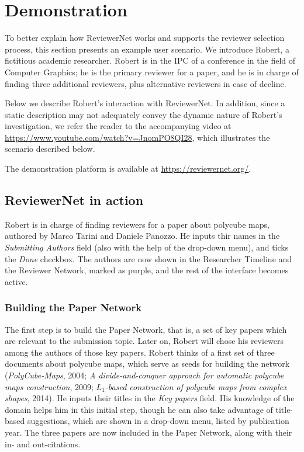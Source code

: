 \chapter{Demonstration}\label{sec:demonstration}
To better explain how ReviewerNet works and supports the reviewer selection process, this section presents an example user scenario. We introduce Robert, a fictitious academic researcher. Robert is in the IPC of a conference in the field of Computer Graphics; he is the primary reviewer for a paper, and he is in charge of finding three additional reviewers, plus alternative reviewers in case of decline. 

Below we describe Robert's interaction with ReviewerNet. In addition, since a static description may not adequately convey the dynamic nature of Robert's investigation, we refer the reader to the accompanying video at \url{https://www.youtube.com/watch?v=JnomPO8QI28}, which illustrates the scenario described below. 

The demonstration platform is available at \url{https://reviewernet.org/}. 

\section{ReviewerNet in action}

Robert is in charge of finding reviewers for a paper about polycube maps, authored by Marco Tarini and Daniele Panozzo. He inputs thir names in the \emph{Submitting Authors} field (also with the help of the drop-down menu), and ticks the \emph{Done} checkbox. The authors are now shown in the Researcher Timeline and the Reviewer Network, marked as purple, and the rest of the interface becomes active. 

\subsection{Building the Paper Network} 
\label{sec:demoPN}
The first step is to build the Paper Network, that is, a set of key papers which are relevant to the submission topic. Later on, Robert will chose his reviewers among the authors of those key papers. Robert thinks of a first set of three documents about polycube maps, which serve as seeds for building the network (\emph{PolyCube-Maps}, 2004; \emph{A divide-and-conquer approach for automatic polycube maps construction}, 2009; \emph{$L_1$-based construction of polycube maps from complex shapes}, 2014). He inputs their titles in the \emph{Key papers} field. His knowledge of the domain helps him in this initial step, though he can also take advantage of title-based suggestions, which are shown in a drop-down menu, listed by publication year. The three papers are now included in the Paper Network, along with their in- and out-citations. 

